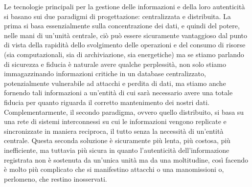 Le tecnologie principali per la gestione delle informazioni e della loro autenticità
si basano sui due paradigmi di progettazione: centralizzata e distribuita.
La prima si basa essenzialmente sulla concentrazione dei dati, e quindi del potere,
nelle mani di un’unità centrale, ciò può essere sicuramente vantaggioso dal punto di
vista della rapidità dello svolgimento delle operazioni e del consumo di risorse
(sia computazionali, sia di archiviazione, sia energetiche) ma se stiamo parlando di
sicurezza e fiducia è naturale avere qualche perplessità, non solo stiamo immagazzinando
informazioni critiche in un database centralizzato, potenzialmente vulnerabile ad attacchi
e perdita di dati, ma stiamo anche fornendo tali informazioni a un’entità di cui sarà
necessario avere una totale fiducia per quanto riguarda il corretto mantenimento dei
nostri dati. \\
Complementarmente, il secondo paradigma, ovvero quello distribuito, si basa
su una rete di sistemi interconnessi su cui le informazioni vengono replicate e sincronizzate
in maniera reciproca, il tutto senza la necessità di un’entità centrale.
Questa seconda soluzione è sicuramente più lenta, più costosa, più inefficiente,
ma tuttavia più sicura in quanto l’autenticità dell’informazione registrata non è sostenuta
da un’unica unità ma da una moltitudine, così facendo è molto più complicato che si
manifestino attacchi o una manomissioni o, perlomeno, che restino inosservati. 

